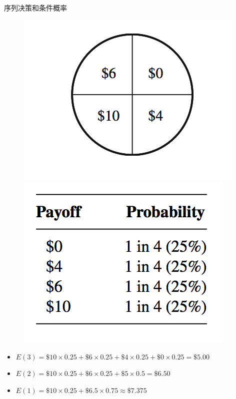 \documentclass[UTF8]{ctexbeamer}
\begin{document}
\begin{frame}{序列决策和条件概率}
  
  \begin{figure}
    \includegraphics[height=0.4\textheight{}]{lunpan.png}
    \includegraphics[height=0.4\textheight{}]{payoff.png}
  \end{figure}

  \begin{itemize}
  \item<1-> $E(3) = \$10 \times 0.25 + \$6 \times 0.25 + \$4 \times 0.25 + \$0 \times 0.25 = \$5.00$
  \item<2-> $E(2) = \$10 \times 0.25 + \$6 \times 0.25 + \$5 \times 0.5 = \$6.50$
  \item<3-> $E(1) = \$10 \times 0.25 + \$6.5 \times 0.75 \approx \$7.375$
  \end{itemize}

\end{frame}
\end{document}
